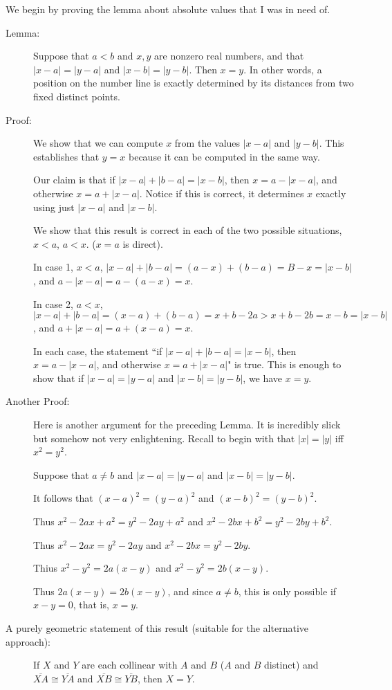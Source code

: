 \documentclass[12pt]{article}
\begin{document}
We begin by proving the lemma about absolute values that I was in need of.

\begin{description}

\item[Lemma:]  Suppose that $a<b$  and $x,y$ are nonzero real numbers, and that $|x-a|=|y-a|$ and $|x-b|=|y-b|$.  Then $x=y$.  In other words, a position on the number line is exactly determined by its distances from two fixed distinct points.

\item[Proof:]  We show that we can compute $x$ from the values $|x-a|$ and $|y-b|$.  This establishes that $y=x$ because it can be computed in the same way.

Our claim is that if $|x-a|+|b-a| = |x-b|$, then $x = a-|x-a|$, and otherwise $x = a+|x-a|$.  Notice if this is correct, it determines $x$ exactly using just $|x-a|$ and $|x-b|$.

We show that this result is correct in each of the two  possible situations, $x<a$, $a<x$.  ($x=a$ is direct).

In case 1, $x<a$, $|x-a|+|b-a| = (a-x)+(b-a) = B-x = |x-b|$, and $a-|x-a| = a - (a-x) = x$.

In case 2,  $a<x$, $|x-a|+|b-a| = (x-a)+(b-a) = x +b - 2a > x+b-2b = x-b = |x-b|$, and $a+|x-a| = a+(x-a)=x$.

In each case, the statement ``if $|x-a|+|b-a| = |x-b|$, then $x = a-|x-a|$, and otherwise $x = a+|x-a|$" is true.  This is enough to show that
if $|x-a|=|y-a|$ and $|x-b|=|y-b|$, we have $x=y$.


\item[Another Proof:]  Here is another argument for the preceding Lemma.  It is incredibly slick but somehow not very enlightening.  Recall to begin with that $|x|=|y|$ iff $x^2=y^2$.

Suppose that  $a \neq b$ and $|x-a|=|y-a|$ and $|x-b|=|y-b|$.

It follows that $(x-a)^2=(y-a)^2$ and $(x-b)^2=(y-b)^2$.

Thus $x^2 -2ax + a^2 = y^2-2ay+a^2$ and $x^2 -2bx + b^2 = y^2-2by+b^2$.

Thus $x^2-2ax = y^2-2ay$ and $x^2 -2bx =y^2-2by$.

Thius $x^2-y^2 = 2a(x-y)$ and $x^2-y^2 = 2b(x-y)$.

Thus $2a(x-y) = 2b(x-y)$, and since $a \neq b$, this is only possible if $x-y=0$, that is, $x=y$.

\item[A purely geometric statement of this result (suitable for the alternative approach):]  If $X$ and $Y$ are each collinear with $A$ and $B$ ($A$ and $B$ distinct) and $\overline{XA} \cong \overline{YA}$ and $\overline{XB} \cong \overline{YB}$, then $X=Y$.





\end{description}
\end{document}
